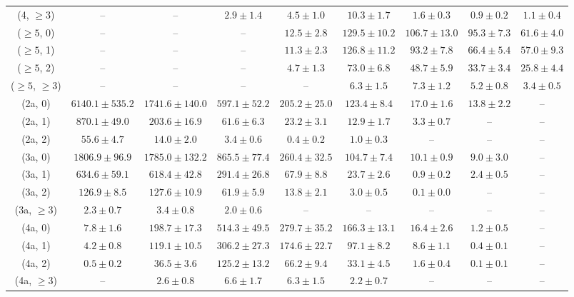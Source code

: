 \begin{table}[h!]
{\begin{tabular}{ccccccccc}
	(4, $\ge3$) & -- & -- & $2.9\pm 1.4$ & $4.5\pm 1.0$ & $10.3\pm 1.7$ & $1.6\pm 0.3$ & $0.9\pm 0.2$ & $1.1\pm 0.4$ \\[0.5ex] 
	($\ge5$, 0) & -- & -- & -- & $12.5\pm 2.8$ & $129.5\pm 10.2$ & $106.7\pm 13.0$ & $95.3\pm 7.3$ & $61.6\pm 4.0$ \\[0.5ex] 
	($\ge5$, 1) & -- & -- & -- & $11.3\pm 2.3$ & $126.8\pm 11.2$ & $93.2\pm 7.8$ & $66.4\pm 5.4$ & $57.0\pm 9.3$ \\[0.5ex] 
	($\ge5$, 2) & -- & -- & -- & $4.7\pm 1.3$ & $73.0\pm 6.8$ & $48.7\pm 5.9$ & $33.7\pm 3.4$ & $25.8\pm 4.4$ \\[0.5ex] 
	($\ge5$, $\ge3$) & -- & -- & -- & -- & $6.3\pm 1.5$ & $7.3\pm 1.2$ & $5.2\pm 0.8$ & $3.4\pm 0.5$ \\[0.5ex] 
	(2a, 0) & $6140.1\pm 535.2$ & $1741.6\pm 140.0$ & $597.1\pm 52.2$ & $205.2\pm 25.0$ & $123.4\pm 8.4$ & $17.0\pm 1.6$ & $13.8\pm 2.2$ & -- \\[0.5ex] 
	(2a, 1) & $870.1\pm 49.0$ & $203.6\pm 16.9$ & $61.6\pm 6.3$ & $23.2\pm 3.1$ & $12.9\pm 1.7$ & $3.3\pm 0.7$ & -- & -- \\[0.5ex] 
	(2a, 2) & $55.6\pm 4.7$ & $14.0\pm 2.0$ & $3.4\pm 0.6$ & $0.4\pm 0.2$ & $1.0\pm 0.3$ & -- & -- & -- \\[0.5ex] 
	(3a, 0) & $1806.9\pm 96.9$ & $1785.0\pm 132.2$ & $865.5\pm 77.4$ & $260.4\pm 32.5$ & $104.7\pm 7.4$ & $10.1\pm 0.9$ & $9.0\pm 3.0$ & -- \\[0.5ex] 
	(3a, 1) & $634.6\pm 59.1$ & $618.4\pm 42.8$ & $291.4\pm 26.8$ & $67.9\pm 8.8$ & $23.7\pm 2.6$ & $0.9\pm 0.2$ & $2.4\pm 0.5$ & -- \\[0.5ex] 
	(3a, 2) & $126.9\pm 8.5$ & $127.6\pm 10.9$ & $61.9\pm 5.9$ & $13.8\pm 2.1$ & $3.0\pm 0.5$ & $0.1\pm 0.0$ & -- & -- \\[0.5ex] 
	(3a, $\ge3$) & $2.3\pm 0.7$ & $3.4\pm 0.8$ & $2.0\pm 0.6$ & -- & -- & -- & -- & -- \\[0.5ex] 
	(4a, 0) & $7.8\pm 1.6$ & $198.7\pm 17.3$ & $514.3\pm 49.5$ & $279.7\pm 35.2$ & $166.3\pm 13.1$ & $16.4\pm 2.6$ & $1.2\pm 0.5$ & -- \\[0.5ex] 
	(4a, 1) & $4.2\pm 0.8$ & $119.1\pm 10.5$ & $306.2\pm 27.3$ & $174.6\pm 22.7$ & $97.1\pm 8.2$ & $8.6\pm 1.1$ & $0.4\pm 0.1$ & -- \\[0.5ex] 
	(4a, 2) & $0.5\pm 0.2$ & $36.5\pm 3.6$ & $125.2\pm 13.2$ & $66.2\pm 9.4$ & $33.1\pm 4.5$ & $1.6\pm 0.4$ & $0.1\pm 0.1$ & -- \\[0.5ex] 
	(4a, $\ge3$) & -- & $2.6\pm 0.8$ & $6.6\pm 1.7$ & $6.3\pm 1.5$ & $2.2\pm 0.7$ & -- & -- & -- \\[0.5ex] 

\end{tabular}}
\end{table}
